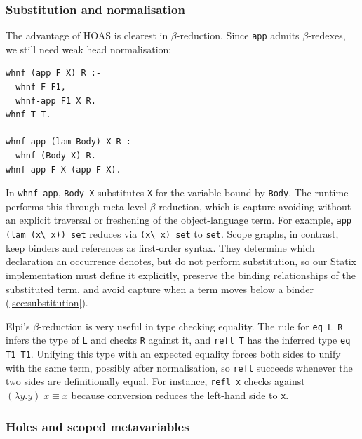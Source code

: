\subsubsection{Substitution and normalisation}

The advantage of HOAS is clearest in $\beta$-reduction. Since \lstinline|app|
admits $\beta$-redexes, we still need weak head normalisation:

\begin{lstlisting}[language=Elpi, caption={Beta reduction through meta-level application},
label={lst:elpi-beta}]
whnf (app F X) R :-
  whnf F F1,
  whnf-app F1 X R.
whnf T T.

whnf-app (lam Body) X R :-
  whnf (Body X) R.
whnf-app F X (app F X).
\end{lstlisting}

\noindent In \texttt{whnf-app}, \lstinline|Body X| substitutes \lstinline|X|
for the variable bound by \lstinline|Body|. The runtime performs this through
meta-level $\beta$-reduction, which is capture-avoiding without an explicit
traversal or freshening of the object-language term. For example,
\lstinline|app (lam (x\ x)) set| reduces via \lstinline|(x\ x) set| to
\lstinline|set|. Scope graphs, in contrast, keep binders and references as
first-order syntax. They determine which declaration an occurrence denotes, but
do not perform substitution, so our Statix implementation must define it
explicitly, preserve the binding relationships of the substituted term, and
avoid capture when a term moves below a binder (\cref{sec:substitution}).

Elpi's $\beta$-reduction is very useful in type checking equality. The rule for \lstinline|eq L R| infers the type of \lstinline|L| and checks \lstinline|R| against it, and \lstinline|refl T| has the inferred type \lstinline|eq T1 T1|. Unifying this type with an expected equality forces both sides to unify with the same term, possibly after normalisation, so \lstinline|refl| succeeds whenever the two sides are definitionally equal. For instance, \lstinline|refl x| checks against $(\lambda y.y)\;x \equiv x$ because conversion reduces the left-hand side to \lstinline|x|.

\subsubsection{Holes and scoped metavariables}

